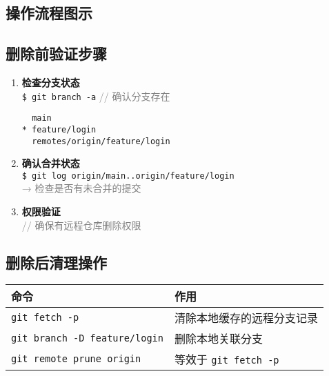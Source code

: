 \subsection{操作流程图示}
\begin{center}
\end{center}

\subsection{删除前验证步骤}
\begin{enumerate}[leftmargin=*, nosep]
    \item \textbf{检查分支状态} \\
    \texttt{\$ git branch -a} \quad \textcolor{gray}{// 确认分支存在}
    \begin{verbatim}
  main
* feature/login
  remotes/origin/feature/login
    \end{verbatim}
    
    \item \textbf{确认合并状态} \\
    \texttt{\$ git log origin/main..origin/feature/login} \\
    \textcolor{gray}{→ 检查是否有未合并的提交}
    
    \item \textbf{权限验证} \\
    \textcolor{gray}{// 确保有远程仓库删除权限}
\end{enumerate}

\subsection{删除后清理操作}
\begin{center}
\begin{tabular}{@{}ll@{}}
    \toprule
    \textbf{命令} & \textbf{作用} \\
    \midrule
    \texttt{git fetch -p} & 清除本地缓存的远程分支记录 \\
    \texttt{git branch -D feature/login} & 删除本地关联分支 \\
    \texttt{git remote prune origin} & 等效于 \texttt{git fetch -p} \\
    \bottomrule
\end{tabular}
\end{center}

